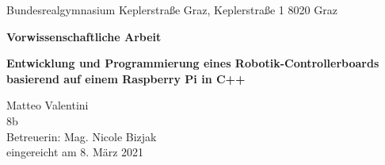 \documentclass[12pt]{article}
\begin{document}
\fontsize{12pt}{18pt}\selectfont
\thispagestyle{empty}
\begin{center}
\fontsize{20pt}{10pt}\selectfont
Bundesrealgymnasium Keplerstraße Graz, Keplerstraße 1 8020 Graz
\end{center}
\vspace{20mm}
\begin{center}
\fontsize{26pt}{10pt}\selectfont
\textbf{Vorwissenschaftliche Arbeit}
\end{center}
\vspace{20mm}
\begin{center}
\fontsize{28pt}{28pt}\selectfont
\textbf{Entwicklung und Programmierung eines Robotik-Controllerboards basierend auf einem Raspberry Pi in C++}
\end{center}
\vspace{20mm}
\begin{center}
\fontsize{20pt}{32pt}\selectfont
Matteo Valentini\\
8b\\
Betreuerin: Mag. Nicole Bizjak\\
eingereicht am 8. März 2021
\end{center}
\end{document}
